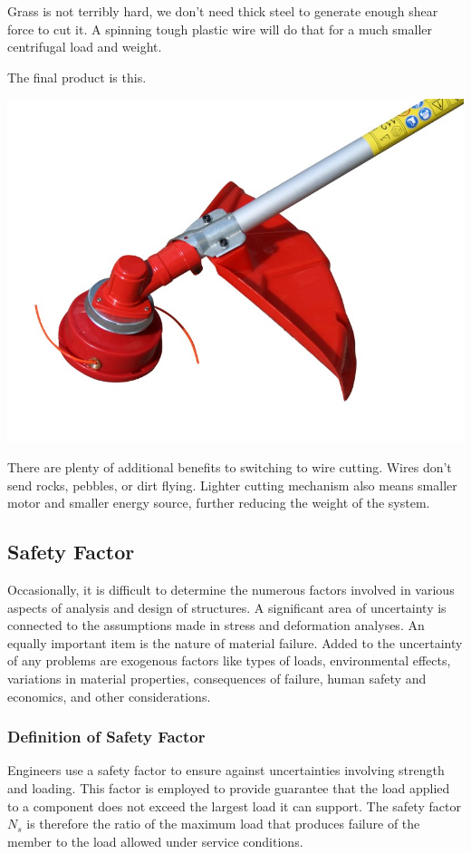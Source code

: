 \documentclass[a4paper,openany,nobib]{tufte-book}
\begin{document}
Grass is not terribly hard, we don't need thick steel to generate enough
shear force to cut it. A spinning tough plastic wire will do that for a
much smaller centrifugal load and weight.

The final product is this.

\begin{center}
\includegraphics[width=.9\linewidth]{pictures/intro-eng-design/cutter-wire.jpg}
\end{center}

There are plenty of additional benefits to switching to wire cutting.
Wires don't send rocks, pebbles, or dirt flying. Lighter cutting
mechanism also means smaller motor and smaller energy source, further
reducing the weight of the system.

\subsection{Safety Factor}
\label{safety-factor}
Occasionally, it is difficult to determine the numerous factors involved
in various aspects of analysis and design of structures. A significant
area of uncertainty is connected to the assumptions made in stress and
deformation analyses. An equally important item is the nature of
material failure. Added to the uncertainty of any problems are exogenous
factors like types of loads, environmental effects, variations in
material properties, consequences of failure, human safety and
economics, and other considerations.

\subsubsection{Definition of Safety Factor}
\label{definition-of-safety-factor}
Engineers use a safety factor to ensure against uncertainties involving
strength and loading. This factor is employed to provide guarantee that
the load applied to a component does not exceed the largest load it can
support. The safety factor \(N_s\) is therefore the ratio of the maximum
load that produces failure of the member to the load allowed under
service conditions.
\end{document}
